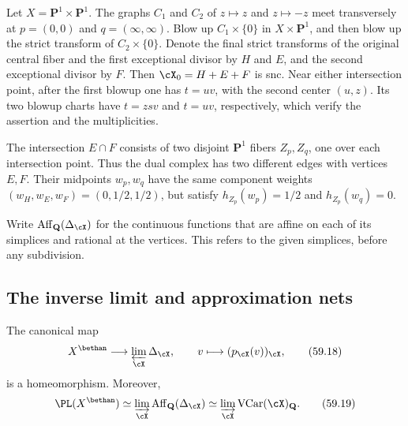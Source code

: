 \begin{example}\label{ex:mp-dual-repeated-edges}
Let $X=\mathbf P^1\times\mathbf P^1$. The graphs $C_1$ and
$C_2$ of $z\mapsto z$ and $z\mapsto-z$ meet transversely at
$p=(0,0)$ and $q=(\infty,\infty)$. Blow up $C_1\times\{0\}$
in $X\times\mathbf P^1$, and then blow up the strict transform
of $C_2\times\{0\}$. Denote the final strict transforms of
the original central fiber and the first exceptional divisor
by $H$ and $E$, and the second exceptional divisor by $F$.
Then $\cX_0=H+E+F$ is snc. Near either intersection point,
after the first blowup one has $t=uv$, with the second center
$(u,z)$. Its two blowup charts have
$t=zsv$ and $t=uv$, respectively, which verify the assertion
and the multiplicities.

The intersection $E\cap F$ consists of two disjoint
$\mathbf P^1$ fibers $Z_p,Z_q$, one over each intersection
point. Thus the dual complex has two different edges with
vertices $E,F$. Their midpoints $w_p,w_q$ have the same
component weights $(w_H,w_E,w_F)=(0,1/2,1/2)$, but satisfy
$h_{Z_p}(w_p)=1/2$ and $h_{Z_p}(w_q)=0$.
\end{example}

Write $\operatorname{Aff}_{\mathbf Q}(\Delta_{\cX})$ for the
continuous functions that are affine on each of its simplices
and rational at the vertices. This refers to the given
simplices, before any subdivision.

\subsection{The inverse limit and approximation nets}
\label{subsec:mp-dual-inverse-limit}

\begin{theorem}\label{thm:mp-inverse-limit-dual}
The canonical map
\[
 X^{\bethan}\longrightarrow\varprojlim_{\cX}\Delta_{\cX},
 \qquad v\longmapsto(p_{\cX}(v))_{\cX},
\tag{59.18}\label{eq:mp-inverse-limit-dual}
\]
is a homeomorphism. Moreover,
\[
 \PL(X^{\bethan})
   \simeq\varinjlim_{\cX}\operatorname{Aff}_{\mathbf Q}(\Delta_{\cX})
   \simeq\varinjlim_{\cX}\operatorname{VCar}(\cX)_{\mathbf Q}.
\tag{59.19}\label{eq:mp-pl-vcar-dual}
\]
\end{theorem}

